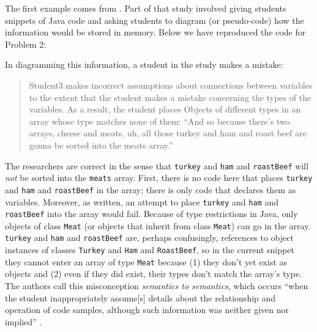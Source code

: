 The first example comes from \cite{kaczmarczyk_identifying_2010}. Part of that
study involved giving students snippets of Java code and asking students
to diagram (or pseudo-code) how the information would be stored in
memory. Below we have reproduced the code for Problem 2:

\hypertarget{sandwiches-code}{\label{sandwiches-code}}
\begin{Shaded}
\begin{Highlighting}[numbers=left,,]
 \NormalTok{Cheese[}\NormalTok{];}
 \NormalTok{Meat[}\NormalTok{];}
 \NormalTok{;}
 \NormalTok{;}
 \NormalTok{();}
 
 
\end{Highlighting}
\end{Shaded}

In diagramming this information, a student in the study makes a mistake:

\begin{quote}
  Student3 makes incorrect assumptions about connections between variables
  to the extent that the student makes a mistake concerning the types of
  the variables. As a result, the student places Objects of different
  types in an array whose type matches none of them: ``And so because
  there's two arrays, cheese and meats, uh, all those turkey and ham and
  roast beef are gonna be sorted into the meats array.'' \cite{kaczmarczyk_identifying_2010}
\end{quote}

The researchers are correct in the sense that \texttt{turkey} and
\texttt{ham} and \texttt{roastBeef} will \emph{not} be sorted into the
\texttt{meats} array. First, there is no code here that places
\texttt{turkey} and \texttt{ham} and \texttt{roastBeef} in the array;
there is only code that
declares them as variables. Moreover, as written, an attempt to place
\texttt{turkey} and \texttt{ham} and \texttt{roastBeef} into the array
would fail. Because of type restrictions in Java, only objects of class
\texttt{Meat} (or objects that inherit from class \texttt{Meat}) can go in the array.
\texttt{turkey} and \texttt{ham} and \texttt{roastBeef} are, perhaps
confusingly, references to object instances of classes \texttt{Turkey}
and \texttt{Ham} and \texttt{RoastBeef}, so in the current snippet they
cannot enter an array of type \texttt{Meat} because (1) they don't yet
exist as objects and (2) even if they did exist, their types don't match
the array's type. The authors call this misconception \emph{semantics to
semantics}, which occurs ``when the student inappropriately
assume{[}s{]} details about the relationship and operation of code
samples, although such information was neither given nor implied''
\cite{kaczmarczyk_identifying_2010}.

